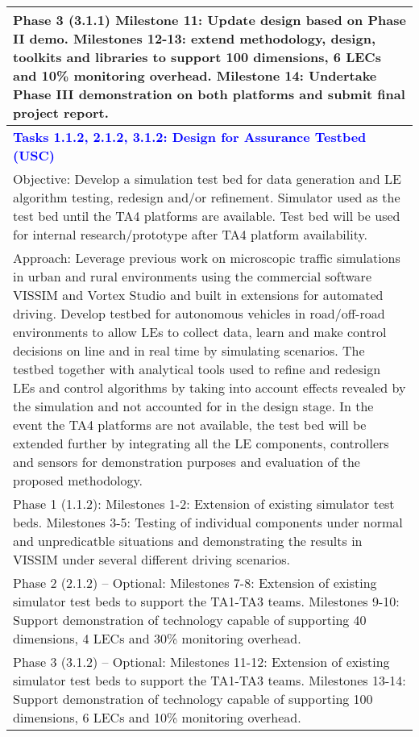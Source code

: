 {\begin{longtable} {|p{\textwidth} | }
Phase 3 (3.1.1) Milestone 11: Update design based on Phase II demo.  Milestones 12-13:  extend methodology, design, toolkits and libraries to support 100 dimensions, 6 LECs and 10\% monitoring overhead.   Milestone 14: Undertake Phase III demonstration on both platforms and submit final project report. \\ \hline
\textcolor{blue} {\footnotesize {\textbf{Tasks 1.1.2, 2.1.2, 3.1.2: Design for Assurance Testbed (USC)} }}\\ \hline
Objective:  Develop a simulation test bed for data generation and LE algorithm testing, redesign and/or refinement.   Simulator used as the test bed until the TA4 platforms are available.   Test bed will be used for internal research/prototype after TA4 platform availability. \\ \hline
Approach:  Leverage previous work on microscopic traffic simulations in urban and rural environments using the commercial software VISSIM and Vortex Studio and built in extensions for automated driving.   Develop testbed for autonomous vehicles in road/off-road environments to allow LEs to collect data, learn and make control decisions on line and in real time by simulating scenarios. The testbed together with analytical tools used to refine and redesign LEs and control algorithms by taking into account effects revealed by the simulation and not accounted for in the design stage.    In the event the TA4 platforms are not available, the test bed will be extended further by integrating all the LE components, controllers and sensors for demonstration purposes and evaluation of the proposed methodology. \\ \hline
Phase 1 (1.1.2):  Milestones 1-2:  Extension of existing simulator test beds.  Milestones 3-5:  Testing of individual components under normal and unpredicatble situations and demonstrating the results in VISSIM under several different driving scenarios. \\ \hline
Phase 2 (2.1.2) – Optional:  Milestones 7-8:  Extension of existing simulator test beds to support the TA1-TA3 teams.  Milestones 9-10:  Support demonstration of technology capable of supporting 40 dimensions, 4 LECs and 30\% monitoring overhead. \\ \hline
Phase 3 (3.1.2) – Optional:  Milestones 11-12:  Extension of existing simulator test beds to support the TA1-TA3 teams.  Milestones 13-14:  Support demonstration of technology capable of supporting 100 dimensions, 6 LECs and 10\% monitoring overhead. \\ \hline

\end{longtable}}
